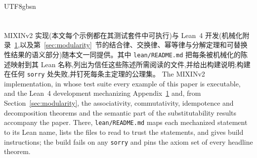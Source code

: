\begin{CJK*}{UTF8}{gbsn}
\section*{}
\ifPaperChinese
MIXINv2 实现(本文每个示例都在其测试套件中可执行)与 Lean~4 开发(机械化附录~\ref{app:well-definedness},以及第~\ref{sec:modularity}~节的结合律、交换律、幂等律与分解定理和可替换性结果的语义部分)随本文一同提供。其中 \texttt{lean/README.md} 把每条被机械化的陈述映射到其 Lean 名称,列出为信任这些陈述所需阅读的文件,并给出构建说明;构建在任何 \texttt{sorry} 处失败,并钉死每条主定理的公理集。
\else
The MIXINv2 implementation, in whose test suite every example of this
paper is executable, and the Lean~4 development mechanizing
Appendix~\ref{app:well-definedness} and, from
Section~\ref{sec:modularity}, the associativity, commutativity,
idempotence and decomposition theorems and the semantic part of
the substitutability results accompany the
paper. There, \texttt{lean/README.md} maps each
mechanized statement to its Lean name, lists the files to read to trust
the statements, and gives build instructions; the build fails on any
\texttt{sorry} and pins the axiom set of every headline theorem.
\fi




\appendix

\section{}
\label{app:well-definedness}


\end{CJK*}
